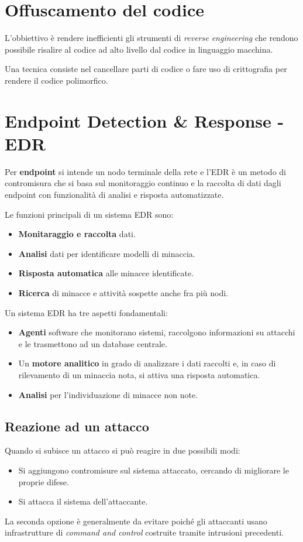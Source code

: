 \section{Offuscamento del codice}
L'obbiettivo è rendere inefficienti gli strumenti di \emph{reverse engineering} che rendono possibile risalire al
codice ad alto livello dal codice in linguaggio macchina.

Una tecnica consiste nel cancellare parti di codice o fare uso di crittografia per rendere il codice polimorfico.

\section{Endpoint Detection \& Response - EDR}
Per \textbf{endpoint} si intende un nodo terminale della rete e l'EDR è un metodo di contromisura che si basa sul
monitoraggio continuo e la raccolta di dati dagli endpoint con funzionalità di analisi e risposta automatizzate.

Le funzioni principali di un sistema EDR sono:
\begin{itemize}
	\item \textbf{Monitaraggio e raccolta} dati.
	\item \textbf{Analisi} dati per identificare modelli di minaccia.
	\item \textbf{Risposta automatica} alle minacce identificate.
	\item \textbf{Ricerca} di minacce e attività sospette anche fra più nodi.
\end{itemize}
Un sistema EDR ha tre aspetti fondamentali:
\begin{itemize}
	\item \textbf{Agenti} software che monitorano sistemi, raccolgono informazioni su attacchi e le trasmettono ad un
	      database centrale.
	\item Un \textbf{motore analitico} in grado di analizzare i dati raccolti e, in caso di rilevamento di un minaccia
	      nota, si attiva una risposta automatica.
	\item \textbf{Analisi} per l'individuazione di minacce non note.
\end{itemize}

\subsection{Reazione ad un attacco}
Quando si subisce un attacco si può reagire in due possibili modi:
\begin{itemize}
	\item Si aggiungono contromisure sul sistema attaccato, cercando di migliorare le proprie difese.
	\item Si attacca il sistema dell'attaccante.
\end{itemize}
La seconda opzione è generalmente da evitare poiché gli attaccanti usano infrastrutture di \emph{command and control}
costruite tramite intrusioni precedenti.

